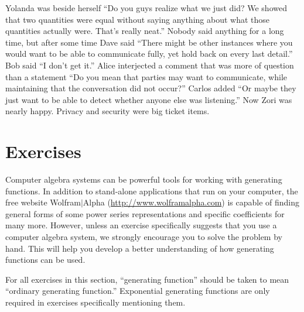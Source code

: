 Yolanda was beside herself ``Do you guys realize what we just
did?  We showed that two quantities were equal without saying
anything about what those quantities actually were.  That's really
neat.''  Nobody said anything for a long time, but after some time
Dave said ``There might be other instances where you would
want to be able to communicate fully, yet hold back on every
last detail.''  Bob said ``I don't get it.''  Alice interjected
a comment that was more of question than a statement ``Do you
mean that parties may want to communicate, while maintaining
that the conversation did not occur?''  Carlos added ``Or maybe
they just want to be able to detect whether anyone else was
listening.''  Now Zori was nearly happy.  Privacy and security were
big ticket items.

\section{Exercises}

Computer algebra systems can be powerful tools for working with
generating functions. In addition to stand-alone applications that run
on your computer, the free website Wolfram$|$Alpha
(\url{http://www.wolframalpha.com}) is capable of finding general
forms of some power series representations and specific coefficients
for many more. However, unless an exercise specifically suggests that
you use a computer algebra system, we strongly encourage you to solve
the problem by hand. This will help you develop a better understanding
of how generating functions can be used.

For all exercises in this section, ``generating function'' should be
taken to mean ``ordinary generating function.'' Exponential generating
functions are only required in exercises specifically mentioning them.

